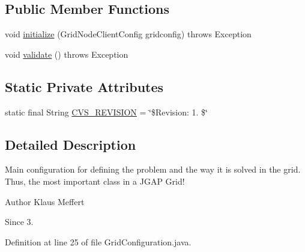 \subsection*{Public Member Functions}
\begin{DoxyCompactItemize}
\item 
void \hyperlink{classexamples_1_1grid_1_1fitness_distributed_1_1_grid_configuration_a4e9be6b835e2ddcaaa681dc333075c16}{initialize} (Grid\-Node\-Client\-Config gridconfig)  throws Exception 
\item 
void \hyperlink{classexamples_1_1grid_1_1fitness_distributed_1_1_grid_configuration_a46a79fa42d8c11c5490f356689499f79}{validate} ()  throws Exception 
\end{DoxyCompactItemize}
\subsection*{Static Private Attributes}
\begin{DoxyCompactItemize}
\item 
static final String \hyperlink{classexamples_1_1grid_1_1fitness_distributed_1_1_grid_configuration_a4848c7e12f509418af153bf94befd7e2}{C\-V\-S\-\_\-\-R\-E\-V\-I\-S\-I\-O\-N} = \char`\"{}\$Revision\-: 1. \$\char`\"{}
\end{DoxyCompactItemize}


\subsection{Detailed Description}
Main configuration for defining the problem and the way it is solved in the grid. Thus, the most important class in a J\-G\-A\-P Grid!

\begin{DoxyAuthor}{Author}
Klaus Meffert 
\end{DoxyAuthor}
\begin{DoxySince}{Since}
3. 
\end{DoxySince}


Definition at line 25 of file Grid\-Configuration.\-java.



